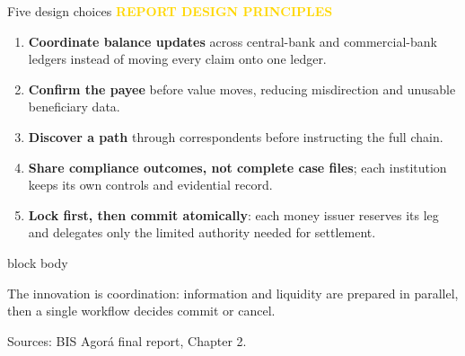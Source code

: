 \documentclass[aspectratio=169,12pt]{beamer}
\newcommand{\rust}[1]{\textcolor{Rust}{\textbf{#1}}}
\newcommand{\source}[1]{\vfill\par\fontsize{5.4}{6.5}\selectfont\color{Quiet}Sources: #1}
\newcommand{\tightitems}{\setlength{\itemsep}{0.42em}\setlength{\parskip}{0pt}}
\newcommand{\reporttag}[1]{\textcolor{Gold}{\fontsize{7.2}{8.5}\selectfont\bfseries REPORT #1}}
\newenvironment{statement}{%
  \begin{beamercolorbox}[sep=.18cm,rounded=false,wd=\linewidth]{block body}%
  \fontsize{13}{15.5}\selectfont\bfseries
}{\end{beamercolorbox}}
\begin{document}
\begin{frame}[shrink=30]{Five design choices}
  \reporttag{DESIGN PRINCIPLES}\par\vspace{0.12cm}
  \begin{enumerate}\tightitems
    \item \rust{Coordinate balance updates} across central-bank and commercial-bank ledgers instead of moving every claim onto one ledger.
    \item \rust{Confirm the payee} before value moves, reducing misdirection and unusable beneficiary data.
    \item \rust{Discover a path} through correspondents before instructing the full chain.
    \item \rust{Share compliance outcomes, not complete case files}; each institution keeps its own controls and evidential record.
    \item \rust{Lock first, then commit atomically}: each money issuer reserves its leg and delegates only the limited authority needed for settlement.
  \end{enumerate}
  \vspace{0.10cm}
  \begin{statement}
    The innovation is coordination: information and liquidity are prepared in parallel, then a single workflow decides commit or cancel.
  \end{statement}
  \source{BIS Agor\'a final report, Chapter 2.}
\end{frame}
\end{document}

